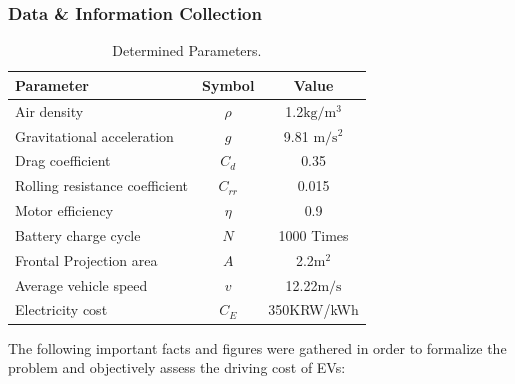 \documentclass[11pt,twocolumn]{article}
\begin{document}
            \subsubsection{Data \& Information Collection}
                \begin{table}
                    \vspace{-15mm}
                    \centering
                    \caption{Determined Parameters.}
                    \label{params}
                    \begin{tabular}{lcc}
                        \toprule
                        Parameter & Symbol & Value\\
                        \midrule
                        Air density & $\rho$ & 1.2$\mathrm{kg/m^3}$ \\
                        Gravitational acceleration & $g$ & 9.81  $\mathrm{m/s^2}$ \\
                        Drag coefficient & $C_d$ & 0.35 \\
                        Rolling resistance coefficient & $C_{rr}$ & 0.015 \\
                        Motor efficiency & $η$ & 0.9 \\
                        Battery charge cycle & $N$ & 1000 Times \\
                        Frontal Projection area & $A$ & 2.2$\mathrm{m^2}$ \\
                        Average vehicle speed & $v$ & 12.22$\mathrm{m/s}$ \\
                        Electricity cost & $C_E$ & 350KRW/kWh \\
                        \bottomrule
                    \end{tabular}
                \end{table}
                The following important facts and figures were gathered in order to formalize the problem and objectively assess the driving cost of EVs:
\end{document}

